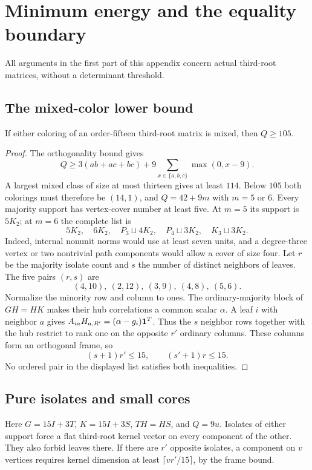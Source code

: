 \section{Minimum energy and the equality boundary}\label{app:energy-new}
All arguments in the first part of this appendix concern actual third-root matrices, without a determinant threshold.
\subsection{The mixed-color lower bound}
\begin{theorem}\label{thm:mixed15-new}
If either coloring of an order-fifteen third-root matrix is mixed, then $Q\ge105$.
\end{theorem}
\begin{proof}
The orthogonality bound gives
\[Q\ge3(ab+ac+bc)+9\sum_{x\in\{a,b,c\}}\max(0,x-9).\]
A largest mixed class of size at most thirteen gives at least $114$. Below $105$ both colorings must therefore be $(14,1)$, and $Q=42+9m$ with $m=5$ or $6$. Every majority support has vertex-cover number at least five. At $m=5$ its support is $5K_2$; at $m=6$ the complete list is
\[5K_2,\quad6K_2,\quad P_3\sqcup4K_2,\quad P_4\sqcup3K_2,\quad K_3\sqcup3K_2.\]
Indeed, internal nonunit norms would use at least seven units, and a degree-three vertex or two nontrivial path components would allow a cover of size four.
Let $r$ be the majority isolate count and $s$ the number of distinct neighbors of leaves. The five pairs $(r,s)$ are
\[(4,10),\ (2,12),\ (3,9),\ (4,8),\ (5,6).\]
Normalize the minority row and column to ones. The ordinary-majority block of $GH=HK$ makes their hub correlations a common scalar $\alpha$. A leaf $i$ with neighbor $a$ gives $A_{ia}H_{a,R'}=(\alpha-g_i)\mathbf1^T$. Thus the $s$ neighbor rows together with the hub restrict to rank one on the opposite $r'$ ordinary columns. These columns form an orthogonal frame, so
\[(s+1)r'\le15,\qquad(s'+1)r\le15.\]
No ordered pair in the displayed list satisfies both inequalities.
\end{proof}

\subsection{Pure isolates and small cores}
Here $G=15I+3T$, $K=15I+3S$, $TH=HS$, and $Q=9u$. Isolates of either support force a flat third-root kernel vector on every component of the other. They also forbid leaves there. If there are $r'$ opposite isolates, a component on $v$ vertices requires kernel dimension at least $\lceil vr'/15\rceil$, by the frame bound.

